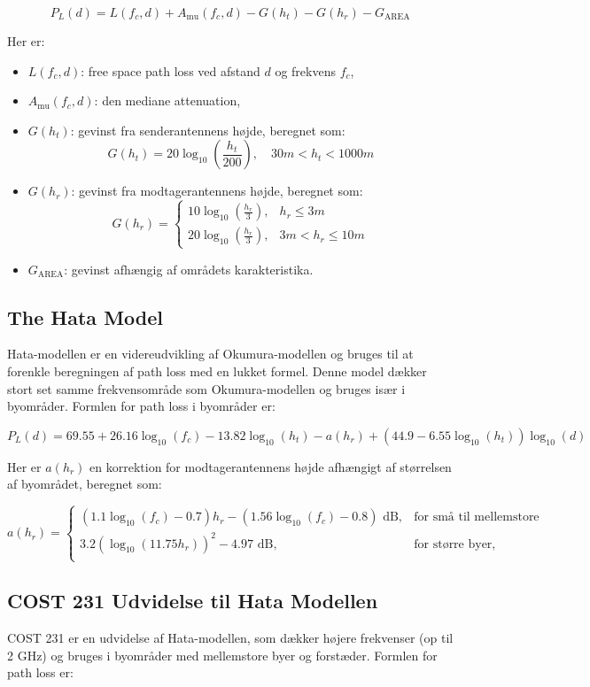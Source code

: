 \documentclass[a4paper,12pt]{book}
\begin{document}
	\[
	P_L(d) = L(f_c, d) + A_{\text{mu}}(f_c, d) - G(h_t) - G(h_r) - G_{\text{AREA}}
	\]
	
	Her er:
	\begin{itemize}
		\item \( L(f_c, d) \): free space path loss ved afstand \(d\) og frekvens \(f_c\),
		\item \( A_{\text{mu}}(f_c, d) \): den mediane attenuation,
		\item \( G(h_t) \): gevinst fra senderantennens højde, beregnet som:
		\[
		G(h_t) = 20\log_{10}\left(\frac{h_t}{200}\right), \quad 30m < h_t < 1000m
		\]
		\item \( G(h_r) \): gevinst fra modtagerantennens højde, beregnet som:
		\[
		G(h_r) = \left\{
		\begin{array}{ll}
			10\log_{10}\left(\frac{h_r}{3}\right), & h_r \leq 3m \\
			20\log_{10}\left(\frac{h_r}{3}\right), & 3m < h_r \leq 10m 
		\end{array}
		\right.
		\]
		\item \( G_{\text{AREA}} \): gevinst afhængig af områdets karakteristika.
	\end{itemize}
	
	\subsection{The Hata Model}
	Hata-modellen er en videreudvikling af Okumura-modellen og bruges til at forenkle beregningen af path loss med en lukket formel. Denne model dækker stort set samme frekvensområde som Okumura-modellen og bruges især i byområder. Formlen for path loss i byområder er:
	
	\[
	P_L(d) = 69.55 + 26.16 \log_{10}(f_c) - 13.82 \log_{10}(h_t) - a(h_r) + \left( 44.9 - 6.55 \log_{10}(h_t) \right) \log_{10}(d)
	\]
	
	Her er \( a(h_r) \) en korrektion for modtagerantennens højde afhængigt af størrelsen af byområdet, beregnet som:
	
	\[
	a(h_r) = \left\{
	\begin{array}{ll}
		(1.1 \log_{10}(f_c) - 0.7)h_r - (1.56 \log_{10}(f_c) - 0.8) \text{ dB}, & \text{for små til mellemstore byer,} \\
		3.2(\log_{10}(11.75h_r))^2 - 4.97 \text{ dB}, & \text{for større byer,} \\
	\end{array}
	\right.
	\]
	
	\subsection{COST 231 Udvidelse til Hata Modellen}
	COST 231 er en udvidelse af Hata-modellen, som dækker højere frekvenser (op til 2 GHz) og bruges i byområder med mellemstore byer og forstæder. Formlen for path loss er:
	
\end{document}
